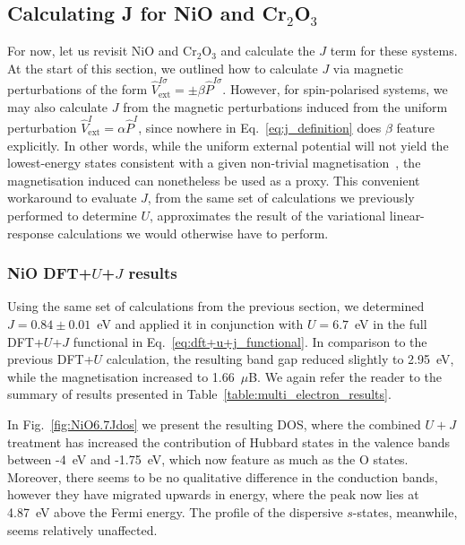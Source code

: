 \subsection{Calculating J for NiO and Cr$_2$O$_3$}

For now, 
let us revisit NiO and Cr$_2$O$_3$ 
and calculate the $J$ term for these systems.
%
At the start of this section, 
we outlined how to calculate $J$ 
via magnetic perturbations of the form 
$\hat{V}^{I\sigma}_\textrm{ext}=\pm\beta\hat{P}^{I\sigma}$.
%
However, 
for spin-polarised systems, 
we may also calculate $J$ 
from the magnetic perturbations induced 
from the uniform perturbation 
$\hat{V}^I_\textrm{ext}=\alpha\hat{P}^{I}$, 
since nowhere in Eq.~\eqref{eq:j_definition} 
does $\beta$ feature explicitly.
%
%
{
In other words, 
while the uniform external potential 
will not yield the lowest-energy states consistent 
with a given non-trivial magnetisation~\cite{PhysRevB.94.035159}, 
the magnetisation induced can nonetheless 
be used as a proxy.
%
This convenient workaround to evaluate $J$, 
from the same set of calculations we previously 
performed to determine $U$, 
approximates the result of the  
variational linear-response calculations 
we would otherwise have to perform.}

\subsubsection{NiO DFT+$U$+$J$ results}

Using the same set of calculations from the previous section, 
we determined $J=0.84\pm0.01$~eV 
and applied it in conjunction with $U=6.7$~eV 
in the full  DFT+$U$+$J$ functional 
in Eq.~\eqref{eq:dft+u+j_functional}.
%
In comparison to the previous DFT+$U$ calculation, 
the resulting band gap reduced slightly to 2.95~eV, 
while the magnetisation increased to 1.66~$\mu$B.
%
{
We again refer the reader to the summary of results 
presented in Table~\ref{table:multi_electron_results}.}

In Fig.~\ref{fig:NiO6.7Jdos} we present 
the resulting DOS, 
where the combined $U+J$ treatment 
{has increased the contribution} of Hubbard states 
in the valence bands between 
-4~eV and -1.75~eV, 
which now {feature} as much as 
the O states.
%
Moreover, 
there seems to be no qualitative difference 
in the conduction bands, 
however they have migrated upwards in energy, 
where the peak now lies at 
4.87~eV above the Fermi energy.
%
The profile of the dispersive $s$-states, 
meanwhile, seems relatively unaffected.

